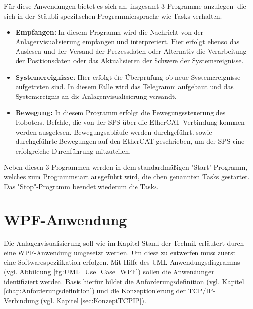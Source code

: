 \documentclass[ a4paper,
                oneside,
                toc=bibliography,
                toc=listof
                ]{scrbook}
\begin{document}
	Für diese Anwendungen bietet es sich an, insgesamt 3 Programme anzulegen, die sich in der Stäubli-spezifischen Programmiersprache wie Tasks verhalten.
	\begin{itemize}
		\item \textbf{Empfangen: } In diesem Programm wird die Nachricht von der Anlagenvisualisierung empfangen und interpretiert. Hier erfolgt ebenso das Auslesen und der Versand der Prozessdaten oder Alternativ die Verarbeitung der Positionsdaten oder das Aktualisieren der Schwere der Systemereignisse.
		\item \textbf{Systemereignisse: } Hier erfolgt die Überprüfung ob neue Systemereignisse aufgetreten sind. In diesem Falle wird das Telegramm aufgebaut und das Systemereignis an die Anlagenvisualisierung versandt. 
		\item \textbf{Bewegung:} In diesem Programm erfolgt die Bewegungssteuerung des Roboters. Befehle, die von der SPS über die EtherCAT-Verbindung kommen werden ausgelesen. Bewegungsabläufe werden durchgeführt, sowie durchgeführte Bewegungen auf den EtherCAT geschrieben, um der SPS eine erfolgreiche Durchführung mitzuteilen.
	\end{itemize}
	Neben diesen 3 Programmen werden in dem standardmäßigen "Start"-Programm, welches zum Programmstart ausgeführt wird, die oben genannten Tasks gestartet. Das "Stop"-Programm beendet wiederum die Tasks.
	\newpage
	\section{WPF-Anwendung}
	Die Anlagenvisualisierung soll wie im Kapitel Stand der Technik erläutert durch eine WPF-Anwendung umgesetzt werden. Um diese zu entwerfen muss zuerst eine Softwarespezifikation erfolgen. Mit Hilfe des UML-Anwendungsdiagramms (vgl. Abbildung \ref{fig:UML_Use_Case_WPF}) sollen die Anwendungen identifiziert werden. Basis hierfür bildet die Anforderungsdefinition (vgl. Kapitel \ref{chap:Anforderungsdefinition}) und die Konzeptionierung der TCP/IP-Verbindung (vgl. Kapitel \ref{sec:KonzeptTCPIP}).
\end{document}
